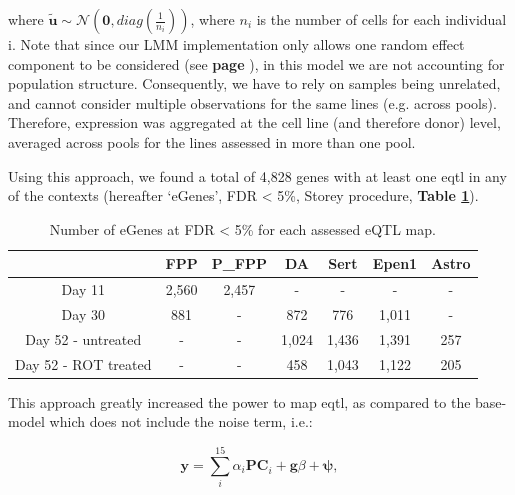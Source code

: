 where $\tilde{\mathbf{u}} \sim \mathcal{N}(\mathbf{0}, diag(\frac{1}{n_i}))$, where $n_i$ is the number of cells for each individual i.
Note that since our LMM implementation only allows one random effect component to be considered (see\textbf{ page \pageref{sec:non_gaussian}}), in this model we are not accounting for population structure.
Consequently, we have to rely on samples being unrelated, and cannot consider multiple observations for the same lines (e.g. across pools). 
Therefore, expression was aggregated at the cell line (and therefore donor) level, averaged across pools for the lines assessed in more than one pool. 

\newpage

Using this approach, we found
a total of 4,828 genes with at least one \gls{eqtl} in any of the contexts (hereafter `eGenes', FDR < 5\%, Storey procedure, \textbf{Table \ref{tab:eqtl_results}}).

\begin{table}[h]
    \centering
    \begin{tabular}{c|c c c c c c}
    &         FPP & P\_FPP & DA & Sert & Epen1 & Astro \\
    \hline
    Day 11  & 2,560 & 2,457 & - & - & - & - \\
    Day 30  & 881 & - &  872 & 776 & 1,011 & -  \\
    Day 52 - untreated & - & - & 1,024 & 1,436 & 1,391 & 257 \\
    Day 52 - ROT treated & - & -  & 458 & 1,043 & 1,122 & 205 \\
    \end{tabular}
    \caption{Number of eGenes at FDR < 5\% for each assessed eQTL map.}
    \label{tab:eqtl_results}
\end{table}


This approach greatly increased the power to map \gls{eqtl},
as compared to the base-model which does not include the noise term, i.e.:

\begin{equation}\label{eq:neuroseq_base}
    \mathbf{y} = \sum_i^{15}\alpha_i \mathbf{PC}_i + \mathbf{g}\beta + \boldsymbol{\psi},
\end{equation}

